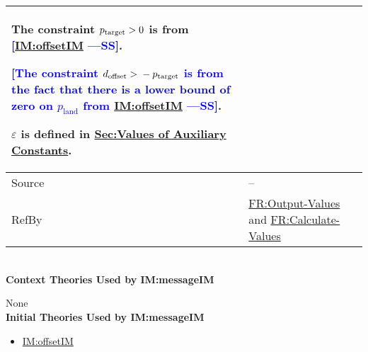 \documentclass[12pt]{article}
\newcommand{\authornote}[3]{\textcolor{#1}{[#3 ---#2]}}
\newcommand{\authornote}[3]{}
\newcommand{\wss}[1]{\authornote{blue}{SS}{#1}}
\newcommand{\gt}{\ensuremath >}
\begin{document}
\begin{minipage}{\textwidth}
\begin{tabular}{>{\raggedright}p{}>{\raggedright\arraybackslash}p{}}
        The constraint ${p_{\text{target}}}\gt{}0$ is from \wss{\hyperref[IM:offsetIM]{IM:offsetIM}}.
        
        \wss{The constraint ${d_{\text{offset}}}\gt{}-{p_{\text{target}}}$ is from the fact that there is a lower bound of zero on ${p_{\text{land}}}$ from \hyperref[IM:offsetIM]{IM:offsetIM}}.
        
        $ε$ is defined in \hyperref[Sec:AuxConstants]{Sec:Values of Auxiliary Constants}.
        
\\ \midrule
Source & --
         
\\ \midrule
RefBy & \hyperref[outputValues]{FR:Output-Values} and \hyperref[calcValues]{FR:Calculate-Values}
        
\\ \bottomrule
\end{tabular}
\end{minipage}
~\\

\noindent \textbf{Context Theories Used by IM:messageIM}

None
~\\

\noindent \textbf{Initial Theories Used by IM:messageIM}

\begin{itemize}
\item \hyperref[IM:offsetIM]{IM:offsetIM}
\end{itemize}
\end{document}

